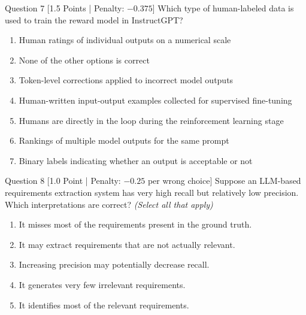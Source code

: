 \documentclass[11pt,a4paper]{article}
\begin{document}
\begin{questionbox}{Question 7 \hfill [1.5 Points | Penalty: $-0.375$]}
Which type of human-labeled data is used to train the reward model in InstructGPT?
\begin{enumerate}[label=\alph*.,leftmargin=2em,itemsep=2pt]
    \item Human ratings of individual outputs on a numerical scale
    \item None of the other options is correct
    \item Token-level corrections applied to incorrect model outputs
    \item Human-written input-output examples collected for supervised fine-tuning
    \item Humans are directly in the loop during the reinforcement learning stage
    \item Rankings of multiple model outputs for the same prompt
    \item Binary labels indicating whether an output is acceptable or not
\end{enumerate}
\end{questionbox}

\vspace{0.3cm}

\begin{questionbox}{Question 8 \hfill [1.0 Point | Penalty: $-0.25$ per wrong choice]}
Suppose an LLM-based requirements extraction system has very high recall but relatively low precision. Which interpretations are correct? \textit{(Select all that apply)}
\begin{enumerate}[label=\alph*.,leftmargin=2em,itemsep=2pt]
    \item It misses most of the requirements present in the ground truth.
    \item It may extract requirements that are not actually relevant.
    \item Increasing precision may potentially decrease recall.
    \item It generates very few irrelevant requirements.
    \item It identifies most of the relevant requirements.
\end{enumerate}
\end{questionbox}
\end{document}
